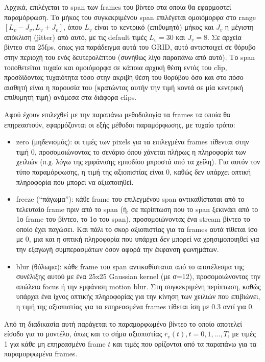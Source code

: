 Αρχικά, επιλέγεται το span των frames του βίντεο στα οποία θα εφαρμοστεί παραμόρφωση. Το μήκος του συγκεκριμένου span επιλέγεται ομοιόμορφα στο range $[L_v - J_v, L_v + J_v]$, όπου $L_v$ είναι το κεντρικό (επιθυμητό) μήκος και $J_v$ η μέγιστη απόκλιση (jitter) από αυτό, με τις default τιμές $L_v = 30$ και $J_v = 8$. Σε αρχεία βίντεο στα 25fps, όπως για παράδειγμα αυτά του GRID, αυτό αντιστοιχεί σε θόρυβο στην περιοχή του ενός δευτερολέπτου (συνήθως λίγο παραπάνω από αυτό). Το span τοποθετείται τυχαία και ομοιόμορφα σε κάποια αρχική θέση εντός του clip, προσδίδοντας τυχαιότητα τόσο στην ακριβή θέση του θορύβου όσο και στο πόσο αισθητή είναι η παρουσία του (κρατώντας αυτήν την τιμή κοντά σε μία κεντρική επιθυμητή τιμή) ανάμεσα στα διάφορα clips.

Αφού έχουν επιλεχθεί με την παραπάνω μεθοδολογία τα frames τα οποία θα επηρεαστούν, εφαρμόζονται οι εξής μέθοδοι παραμόρφωσης, με τυχαίο τρόπο:

\begin{itemize}
\item zero (μηδενισμός): οι τιμές των pixels για τα επιλεγμένα frames τίθενται στην τιμή 0, προσομοιώνοντας το σενάριο όπου χάνεται πλήρως η πληροφορία των χειλιών (π.χ. λόγω της εμφάνισης εμποδίου μπροστά από τα χείλη). Για αυτόν τον τύπο παραμόρφωσης, η τιμή της αξιοπιστίας είναι 0, καθώς δεν υπάρχει οπτική πληροφορία που μπορεί να αξιοποιηθεί.

\item freeze (``πάγωμα''): κάθε frame του επιλεγμένου span αντικαθίσταται από το τελευταίο frame πριν από το span (ή, σε περίπτωση που το span ξεκινάει από το 1ο frame του βίντεο, το 1ο του span), προσομοιώνοντας ένα stream βίντεο το οποίο έχει παγώσει. Και πάλι το σκορ αξιοπιστίας για τα frames αυτά τίθεται ίσο με 0, μια και η οπτική πληροφορία που υπάρχει δεν μπορεί να χρησιμοποιηθεί για την εξαγωγή συμπερασμάτων όσον αφορά την έκφανση φωνημάτων. 

\item blur (θόλωμα): κάθε frame του span αντικαθίσταται από το αποτέλεσμα της συνέλιξης αυτού με ένα 25x25 Gaussian kernel (με σ=12), προσομοιώνοντας την απώλεια focus ή την εμφάνιση motion blur. Στη συγκεκριμένη περίπτωση, καθώς υπάρχει ένα ίχνος οπτικής πληροφορίας για την κίνηση των χειλιών που επιβιώνει, η τιμή της αξιοπιστίας για τα επηρεασμένα frames τίθεται ίση με 0.3 αντί για 0.
\end{itemize}

Από τη διαδικασία αυτή παράγεται το παραμορφωμένο βίντεο το οποίο αποτελεί είσοδο για το μοντέλο, όπως και το σήμα αξιοπιστίας $r_v(t), t = 0,1,...,T$, με τιμές 1 για κάθε μη επηρεασμένο frame $t$ και τιμές που ορίζονται από τα παραπάνω για τα παραμορφωμένα frames.

